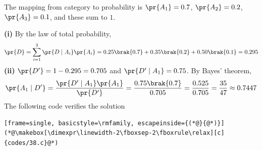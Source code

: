\begin{enumerate}[label=\thesubsection.\arabic*, ref=\thesubsection.\theenumi]
\solution
The mapping from category to probability is $\pr{A_1} = 0.7$, $\pr{A_2} = 0.2$, $\pr{A_3} = 0.1$, and these sum to $1$.

\textbf{(i)} By the law of total probability,
\begin{align}
	\pr{D} = \sum_{i=1}^{3}\pr{D\mid A_i}\pr{A_i} = 0.25\brak{0.7} + 0.35\brak{0.2} + 0.50\brak{0.1} = 0.295
\end{align}
\textbf{(ii)} $\pr{D^{\prime}} = 1 - 0.295 = 0.705$ and $\pr{D^{\prime}\mid A_1} = 0.75$. By Bayes' theorem,
\begin{align}
	\pr{A_1\mid D^{\prime}} = \frac{\pr{D^{\prime}\mid A_1}\pr{A_1}}{\pr{D^{\prime}}} = \frac{0.75\brak{0.7}}{0.705} = \frac{0.525}{0.705} = \frac{35}{47} \approx 0.7447
\end{align}
The following code verifies the solution
\begin{lstlisting}[frame=single, basicstyle=\rmfamily, escapeinside={(*@}{@*)}]
(*@\makebox[\dimexpr\linewidth-2\fboxsep-2\fboxrule\relax][c]{codes/38.c}@*)
\end{lstlisting}

\end{enumerate}
